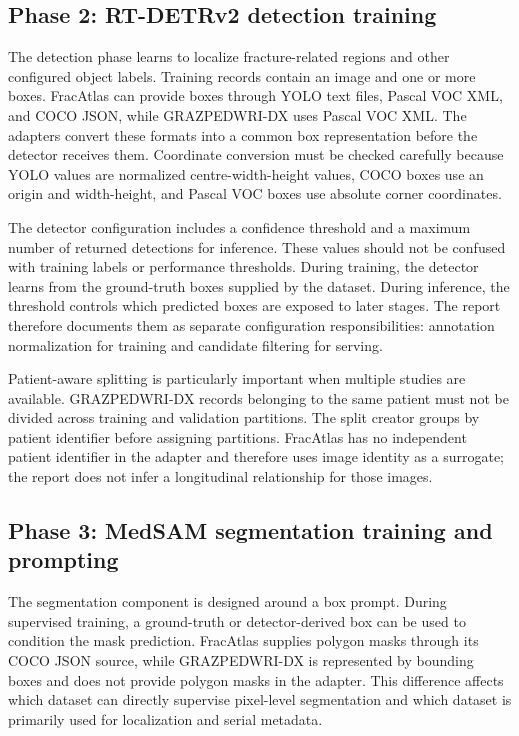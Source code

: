 \documentclass[12pt,a4paper]{article}
\begin{document}
\subsection{Phase 2: RT-DETRv2 detection training}
The detection phase learns to localize fracture-related regions and other configured object labels. Training records contain an image and one or more boxes. FracAtlas can provide boxes through YOLO text files, Pascal VOC XML, and COCO JSON, while GRAZPEDWRI-DX uses Pascal VOC XML. The adapters convert these formats into a common box representation before the detector receives them. Coordinate conversion must be checked carefully because YOLO values are normalized centre-width-height values, COCO boxes use an origin and width-height, and Pascal VOC boxes use absolute corner coordinates.

The detector configuration includes a confidence threshold and a maximum number of returned detections for inference. These values should not be confused with training labels or performance thresholds. During training, the detector learns from the ground-truth boxes supplied by the dataset. During inference, the threshold controls which predicted boxes are exposed to later stages. The report therefore documents them as separate configuration responsibilities: annotation normalization for training and candidate filtering for serving.

Patient-aware splitting is particularly important when multiple studies are available. GRAZPEDWRI-DX records belonging to the same patient must not be divided across training and validation partitions. The split creator groups by patient identifier before assigning partitions. FracAtlas has no independent patient identifier in the adapter and therefore uses image identity as a surrogate; the report does not infer a longitudinal relationship for those images.

\subsection{Phase 3: MedSAM segmentation training and prompting}
The segmentation component is designed around a box prompt. During supervised training, a ground-truth or detector-derived box can be used to condition the mask prediction. FracAtlas supplies polygon masks through its COCO JSON source, while GRAZPEDWRI-DX is represented by bounding boxes and does not provide polygon masks in the adapter. This difference affects which dataset can directly supervise pixel-level segmentation and which dataset is primarily used for localization and serial metadata.
\end{document}
